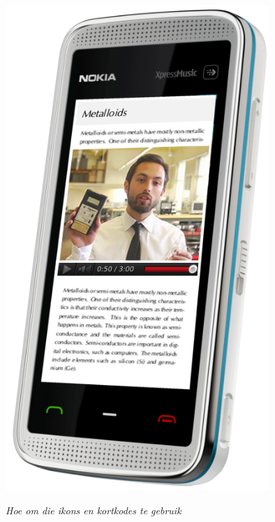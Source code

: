\begin{center}
\begin{minipage}{0.3\textwidth}
\includegraphics[width=0.75\textwidth]{title_images/phone.png}
\end{minipage}
\end{center}

\vspace*{2cm}


{\normalfont\sffamily\fontsize{22}\normalfont\itshape Hoe om die ikons en kortkodes te gebruik} \par


